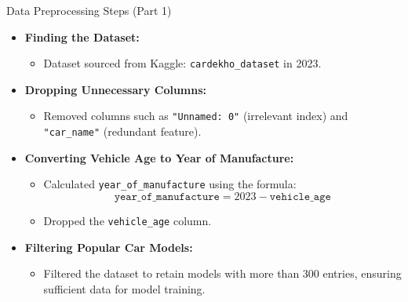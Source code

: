 \documentclass{beamer}
\begin{document}
\begin{frame}{Data Preprocessing Steps (Part 1)}
    \begin{itemize}
        \item \textbf{Finding the Dataset:} 
        \begin{itemize}
            \item Dataset sourced from Kaggle: \texttt{cardekho\_dataset} in 2023.
        \end{itemize}
        
        \item \textbf{Dropping Unnecessary Columns:}
        \begin{itemize}
            \item Removed columns such as \texttt{"Unnamed: 0"} (irrelevant index) and \texttt{"car\_name"} (redundant feature).
        \end{itemize}
        
        \item \textbf{Converting Vehicle Age to Year of Manufacture:}
        \begin{itemize}
            \item Calculated \texttt{year\_of\_manufacture} using the formula: 
            \[ \texttt{year\_of\_manufacture} = 2023 - \texttt{vehicle\_age} \]
            \item Dropped the \texttt{vehicle\_age} column.
        \end{itemize}
        
        \item \textbf{Filtering Popular Car Models:}
        \begin{itemize}
            \item Filtered the dataset to retain models with more than 300 entries, ensuring sufficient data for model training.
        \end{itemize}
    \end{itemize}
\end{frame}
\end{document}
